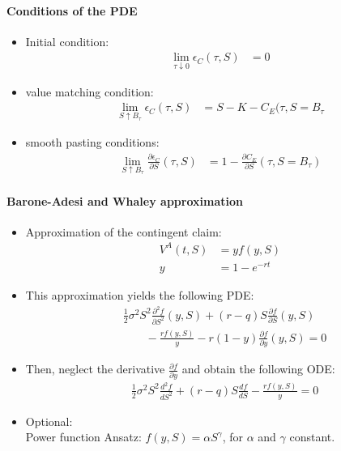 \documentclass[a4paper,landscape,7pt,fleqn]{scrartcl}
\begin{document}
\begin{multicols*}{3}
\paragraph{Conditions of the PDE}
\begin{itemize}
\item Initial condition:
\begin{align*}
\lim\limits_{\tau \downarrow 0} \epsilon_C(\tau,S) &= 0
\end{align*}
\item value matching condition:
\begin{align*}
\lim\limits_{S \uparrow B_\tau} \epsilon_C(\tau,S) &= S-K-C_E(\tau,S=B_\tau
\end{align*}
\item smooth pasting conditions:
\begin{align*}
\lim\limits_{S \uparrow B_\tau} \frac{\partial \epsilon_C}{\partial S}(\tau,S) &= 1 - \frac{\partial C_E}{\partial S}(\tau, S=B_\tau)
\end{align*}
\end{itemize}

\paragraph{Barone-Adesi and Whaley approximation}
\begin{itemize}
\item Approximation of the contingent claim:
\begin{align*}
V^A(t,S) &= y f(y,S) \\
y &= 1 - e^{-r t}
\end{align*}
\item This approximation yields the following PDE:
\begin{align*}
&\frac{1}{2} \sigma^2 S^2 \frac{\partial^2 f}{\partial S^2}(y,S) + (r-q) S \frac{\partial f}{\partial S}(y,S) \\
& \qquad - \frac{r f(y,S)}{y} - r(1-y) \frac{\partial f}{\partial y}(y,S) = 0
\end{align*}
\item Then, neglect the derivative $\frac{\partial f}{\partial y}$ and obtain the following ODE:
\begin{align*}
&\frac{1}{2} \sigma^2 S^2 \frac{d^2 f}{d S^2} + (r-q) S \frac{df}{dS} - \frac{r f(y,S)}{y} = 0
\end{align*}
\item Optional: \\
Power function Ansatz: $f(y,S) = \alpha S^\gamma$, for $\alpha$ and $\gamma$ constant.
\end{itemize}


\end{multicols*}
\end{document}
